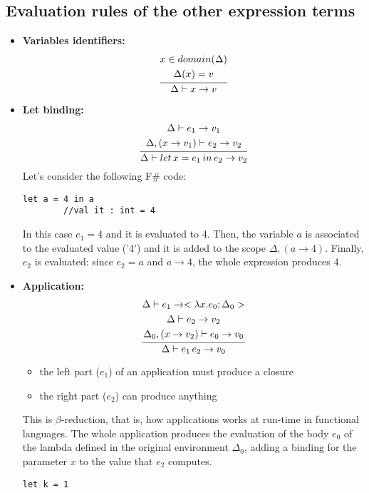 \subsection{Evaluation rules of the other expression terms}
\begin{itemize}
    \item \textbf{Variables identifiers:}
    \[
    \infer{\Delta \vdash x \rightarrow v}{
    \begin{gathered}
        x \in domain(\Delta)\\
        \Delta(x) = v
    \end{gathered}}
    \]

    \item \textbf{Let binding:}
    \[
    \infer{\Delta \vdash let \, x = e_{1} \, in \, e_{2} \rightarrow v_{2}}{\begin{gathered}
        \Delta \vdash e_{1} \rightarrow v_{1}\\
        \Delta, (x\rightarrow v_{1}) \vdash e_{2} \rightarrow v_{2}
    \end{gathered}}
    \]
    Let's consider the following F\# code:
    \begin{lstlisting}[style=FSharpStyle]
        let a = 4 in a
        //val it : int = 4
    \end{lstlisting}
    In this case $e_{1} = 4$ and it is evaluated to 4. Then, the variable $a$ is associated to the evaluated value ('4') and it is added to the scope $\Delta, (a \rightarrow 4)$. Finally, $e_{2}$ is evaluated: since $e_{2} = a$ and $a \rightarrow 4$, the whole expression produces 4.

    \item \textbf{Application:}
    \[
    \infer{\Delta \vdash e_{1} \, e_{2} \rightarrow v_{0}}{\begin{gathered}
        \Delta \vdash e_{1} \rightarrow <\lambda x.e_{0};\Delta_{0}>\\
        \Delta \vdash e_{2} \rightarrow v_{2}\\
        \Delta_{0}, (x \rightarrow v_{2}) \vdash e_{0} \rightarrow v_{0} 
    \end{gathered}}
    \]
    \begin{itemize}
        \item the left part ($e_{1}$) of an application must produce a closure
        \item the right part ($e_{2}$) can produce anything
    \end{itemize}
    This is $\beta$-reduction, that is, how applications works at run-time in functional languages.\newline\newline
    The whole application produces the evaluation of the body $e_{0}$ of the lambda defined in the original environment $\Delta_{0}$, adding a binding for the parameter $x$ to the value that $e_{2}$ computes.
    \begin{lstlisting}[style=FSharpStyle]
        let k = 1


\end{lstlisting}
\end{itemize}

